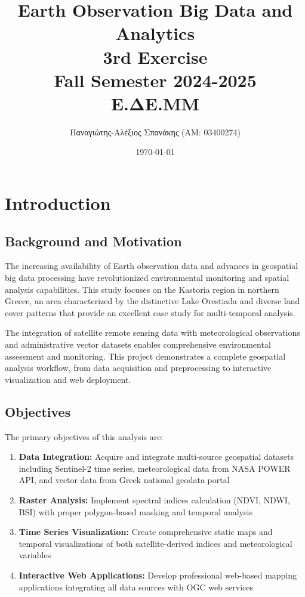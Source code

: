 \documentclass[a4paper,12pt]{article}
\title{Earth Observation Big Data and Analytics\\ 3rd Exercise \\ Fall Semester 2024-2025 \\ Ε.ΔE.ΜΜ}
\author{Παναγιώτης-Αλέξιος Σπανάκης (ΑΜ: 03400274)}
\date{\today}
\begin{document}
\maketitle

\tableofcontents
\newpage

\section{Introduction}

\subsection{Background and Motivation}

The increasing availability of Earth observation data and advances in
geospatial big data processing have revolutionized environmental monitoring and
spatial analysis capabilities. This study focuses on the Kastoria region in
northern Greece, an area characterized by the distinctive Lake Orestiada and
diverse land cover patterns that provide an excellent case study for
multi-temporal analysis.

The integration of satellite remote sensing data with meteorological
observations and administrative vector datasets enables comprehensive
environmental assessment and monitoring. This project demonstrates a complete
geospatial analysis workflow, from data acquisition and preprocessing to
interactive visualization and web deployment.

\subsection{Objectives}

The primary objectives of this analysis are:

\begin{enumerate}
    \item \textbf{Data Integration:} Acquire and integrate multi-source geospatial datasets including Sentinel-2 time series, meteorological data from NASA POWER API, and vector data from Greek national geodata portal

    \item \textbf{Raster Analysis:} Implement spectral indices calculation (NDVI, NDWI, BSI) with proper polygon-based masking and temporal analysis

    \item \textbf{Time Series Visualization:} Create comprehensive static maps and temporal visualizations of both satellite-derived indices and meteorological variables

    \item \textbf{Interactive Web Applications:} Develop professional web-based mapping applications integrating all data sources with OGC web services
\end{enumerate}
\end{document}
